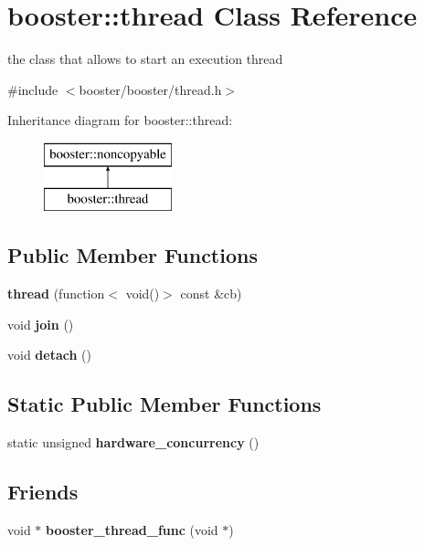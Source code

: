 \section{booster\-:\-:thread \-Class \-Reference}
\label{classbooster_1_1thread}


the class that allows to start an execution thread  




{\ttfamily \#include $<$booster/booster/thread.\-h$>$}

\-Inheritance diagram for booster\-:\-:thread\-:\begin{figure}[H]
\begin{center}
\leavevmode
\includegraphics[height=2.000000cm]{classbooster_1_1thread}
\end{center}
\end{figure}
\subsection*{\-Public \-Member \-Functions}
\begin{DoxyCompactItemize}
\item 
{\bf thread} (function$<$ void()$>$ const \&cb)
\item 
void {\bf join} ()
\item 
void {\bf detach} ()
\end{DoxyCompactItemize}
\subsection*{\-Static \-Public \-Member \-Functions}
\begin{DoxyCompactItemize}
\item 
static unsigned {\bf hardware\-\_\-concurrency} ()
\end{DoxyCompactItemize}
\subsection*{\-Friends}
\begin{DoxyCompactItemize}
\item 
void $\ast$ {\bfseries booster\-\_\-thread\-\_\-func} (void $\ast$)\label{classbooster_1_1thread_a43f901dbff4f76ecba6c6903170ac7c5}

\end{DoxyCompactItemize}


